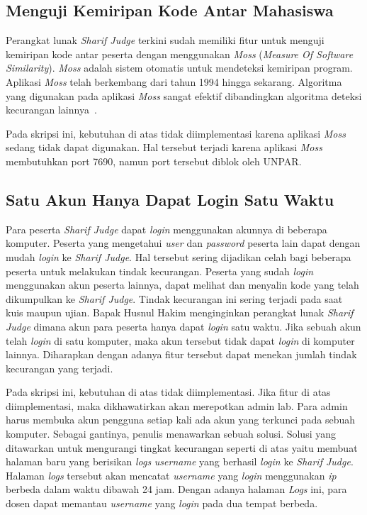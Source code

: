 \subsection{Menguji Kemiripan Kode Antar Mahasiswa}
Perangkat lunak \textit{Sharif Judge} terkini sudah memiliki fitur untuk menguji kemiripan kode antar peserta dengan menggunakan \textit{Moss} (\textit{Measure Of Software Similarity}). \textit{Moss} adalah sistem otomatis untuk mendeteksi kemiripan program. Aplikasi \textit{Moss} telah berkembang dari tahun 1994 hingga sekarang. Algoritma yang digunakan pada aplikasi \textit{Moss} sangat efektif dibandingkan algoritma deteksi kecurangan lainnya~\cite{aiken:10:moss}. 

Pada skripsi ini, kebutuhan di atas tidak diimplementasi karena aplikasi \textit{Moss} sedang tidak dapat digunakan. Hal tersebut terjadi karena aplikasi \textit{Moss} membutuhkan port 7690, namun port tersebut diblok oleh UNPAR.

\subsection{Satu Akun Hanya Dapat Login Satu Waktu}
Para peserta \textit{Sharif Judge} dapat \textit{login} menggunakan akunnya di beberapa komputer. Peserta yang mengetahui \textit{user} dan \textit{password} peserta lain dapat dengan mudah \textit{login} ke \textit{Sharif Judge}. Hal tersebut sering dijadikan celah bagi beberapa peserta untuk melakukan tindak kecurangan. Peserta yang sudah \textit{login} menggunakan akun peserta lainnya, dapat melihat dan menyalin kode yang telah dikumpulkan ke \textit{Sharif Judge}. Tindak kecurangan ini sering terjadi pada saat kuis maupun ujian. Bapak Husnul Hakim menginginkan perangkat lunak \textit{Sharif Judge} dimana akun para peserta hanya dapat \textit{login} satu waktu. Jika sebuah akun telah \textit{login} di satu komputer, maka akun tersebut tidak dapat \textit{login} di komputer lainnya. Diharapkan dengan adanya fitur tersebut dapat menekan jumlah tindak kecurangan yang terjadi. 

Pada skripsi ini, kebutuhan di atas tidak diimplementasi. Jika fitur di atas diimplementasi, maka dikhawatirkan akan merepotkan admin lab. Para admin harus membuka akun pengguna setiap kali ada akun yang terkunci pada sebuah komputer. Sebagai gantinya, penulis menawarkan sebuah solusi. Solusi yang ditawarkan untuk mengurangi tingkat kecurangan seperti di atas yaitu membuat halaman baru yang berisikan \textit{logs} \textit{username} yang berhasil \textit{login} ke \textit{Sharif Judge}. Halaman \textit{logs} tersebut akan mencatat \textit{username} yang \textit{login} menggunakan \textit{ip} berbeda dalam waktu dibawah 24 jam. Dengan adanya halaman \textit{Logs} ini, para dosen dapat memantau \textit{username} yang \textit{login} pada dua tempat berbeda.

